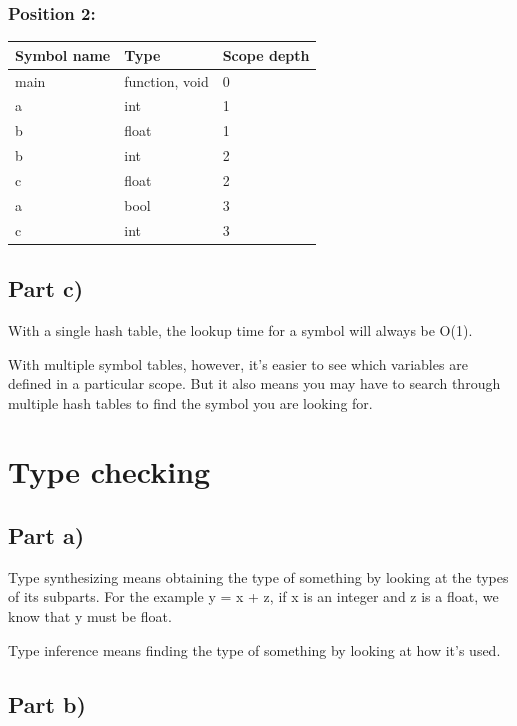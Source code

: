 \documentclass[paper=a4, fontsize=11pt]{scrartcl} %
\numberwithin{equation}{section} %
\numberwithin{figure}{section} %
\numberwithin{table}{section} %
\begin{document}
\subsubsection{Position 2:}
\begin{table}[ht!]
    \center
    \begin{tabular}{|l|l|l|}
    \hline
    Symbol name & Type           & Scope depth \\ \hline
    main        & function, void & 0 \\ \hline
    a        & int     & 1 \\ \hline
    b        & float   & 1 \\ \hline
    b        & int    & 2 \\ \hline
    c        & float  & 2 \\ \hline
    a        & bool   & 3 \\ \hline
    c        & int    & 3 \\ \hline
    \end{tabular}
\end{table}

\subsection{Part c)}

With a single hash table, the lookup time for a symbol will always be O(1).

With multiple symbol tables, however, it's easier to see which variables are defined in a particular scope. But it also means you may have to search through multiple hash tables to find the symbol you are looking for.

\section{Type checking}

\subsection{Part a)}
Type synthesizing means obtaining the type of something by looking at the types of its subparts.
For the example y = x + z, if x is an integer and z is a float, we know that y must be float.

Type inference means finding the type of something by looking at how it's used.

\subsection{Part b)}
\end{document}
